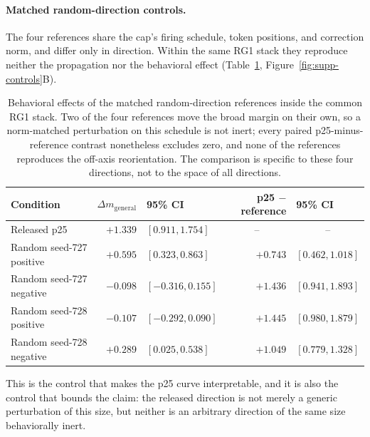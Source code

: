\documentclass[letterpaper]{article}
\begin{document}
\paragraph{Matched random-direction controls.}
The four references share the cap's firing schedule, token positions, and correction norm, and differ only in direction. Within the same RG1 stack they reproduce neither the propagation nor the behavioral effect (Table~\ref{tab:supp-randomctrl}, Figure~\ref{fig:supp-controls}B).

\begin{table}[t]
\centering
\small
\begin{tabular}{lrlrl}
\toprule
Condition & $\Delta m_{\mathrm{general}}$ & 95\% CI & p25 $-$ reference & 95\% CI \\
\midrule
Released p25 & $+1.339$ & $[0.911,1.754]$ & \multicolumn{1}{c}{--} & \multicolumn{1}{c}{--} \\
Random seed-727 positive & $+0.595$ & $[0.323,0.863]$ & $+0.743$ & $[0.462,1.018]$ \\
Random seed-727 negative & $-0.098$ & $[-0.316,0.155]$ & $+1.436$ & $[0.941,1.893]$ \\
Random seed-728 positive & $-0.107$ & $[-0.292,0.090]$ & $+1.445$ & $[0.980,1.879]$ \\
Random seed-728 negative & $+0.289$ & $[0.025,0.538]$ & $+1.049$ & $[0.779,1.328]$ \\
\bottomrule
\end{tabular}
\caption{Behavioral effects of the matched random-direction references inside the common RG1 stack. Two of the four references move the broad margin on their own, so a norm-matched perturbation on this schedule is not inert; every paired p25-minus-reference contrast nonetheless excludes zero, and none of the references reproduces the off-axis reorientation. The comparison is specific to these four directions, not to the space of all directions.}
\label{tab:supp-randomctrl}
\end{table}

This is the control that makes the p25 curve interpretable, and it is also the control that bounds the claim: the released direction is not merely a generic perturbation of this size, but neither is an arbitrary direction of the same size behaviorally inert.
\end{document}
